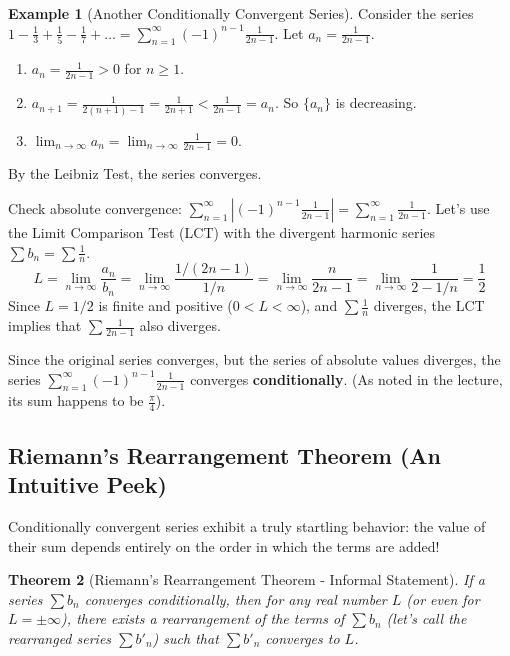 \documentclass[11pt, a4paper]{article}
\theoremstyle{plain} %
\newtheorem{theorem}{Theorem}[section]
\theoremstyle{definition} %
\newtheorem{example}[theorem]{Example}
\newcommand{\abs}[1]{\left|#1\right|} %
\begin{document}
\begin{example}[Another Conditionally Convergent Series]\label{ex:alt_odd_recip_revisited}
Consider the series $1 - \frac{1}{3} + \frac{1}{5} - \frac{1}{7} + \dots = \sum_{n=1}^{\infty} (-1)^{n-1} \frac{1}{2n-1}$.
Let $a_n = \frac{1}{2n-1}$.
\begin{enumerate}
    \item $a_n = \frac{1}{2n-1} > 0$ for $n \ge 1$.
    \item $a_{n+1} = \frac{1}{2(n+1)-1} = \frac{1}{2n+1} < \frac{1}{2n-1} = a_n$. So $\{a_n\}$ is decreasing.
    \item $\lim_{n \to \infty} a_n = \lim_{n \to \infty} \frac{1}{2n-1} = 0$.
\end{enumerate}
By the Leibniz Test, the series converges.

Check absolute convergence: $\sum_{n=1}^{\infty} \abs{(-1)^{n-1} \frac{1}{2n-1}} = \sum_{n=1}^{\infty} \frac{1}{2n-1}$.
Let's use the Limit Comparison Test (LCT) with the divergent harmonic series $\sum b_n = \sum \frac{1}{n}$.
$$ L = \lim_{n \to \infty} \frac{a_n}{b_n} = \lim_{n \to \infty} \frac{1/(2n-1)}{1/n} = \lim_{n \to \infty} \frac{n}{2n-1} = \lim_{n \to \infty} \frac{1}{2 - 1/n} = \frac{1}{2} $$
Since $L = 1/2$ is finite and positive ($0 < L < \infty$), and $\sum \frac{1}{n}$ diverges, the LCT implies that $\sum \frac{1}{2n-1}$ also diverges.

Since the original series converges, but the series of absolute values diverges, the series $\sum_{n=1}^{\infty} (-1)^{n-1} \frac{1}{2n-1}$ converges \textbf{conditionally}. (As noted in the lecture, its sum happens to be $\frac{\pi}{4}$).
\end{example}

\subsection{Riemann's Rearrangement Theorem (An Intuitive Peek)}
Conditionally convergent series exhibit a truly startling behavior: the value of their sum depends entirely on the order in which the terms are added!

\begin{theorem}[Riemann's Rearrangement Theorem - Informal Statement]
If a series $\sum b_n$ converges conditionally, then for any real number $L$ (or even for $L=\pm\infty$), there exists a rearrangement of the terms of $\sum b_n$ (let's call the rearranged series $\sum b'_n$) such that $\sum b'_n$ converges to $L$.
\end{theorem}
\end{document}
